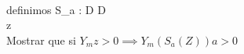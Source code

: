 \documentclass[10pt,a4paper]{article} %
\begin{document}
                \\ definimos S_a : D \implies D 
                \\ z \implies {} 
                \\ Mostrar que si $  Y_m  z>0  \implies  Y_m (S_a (Z))a > 0  $
                
            



    
    \nocite{*}
    
    
\end{document}
